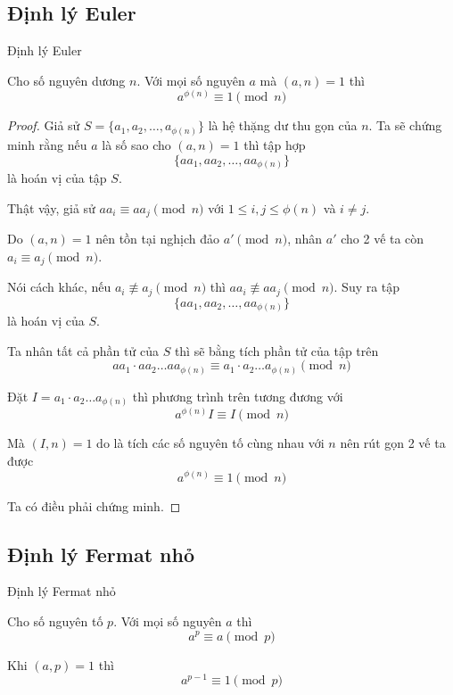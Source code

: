 \subsection{Định lý Euler}

\begin{theoremblock}{Định lý Euler}
    
    Cho số nguyên dương $n$. Với mọi số nguyên $a$ mà $(a, n) = 1$ thì \[a^{\phi(n)} \equiv 1 \pmod n \]
\end{theoremblock}

\begin{proof}
    Giả sử $S = \{a_1, a_2, \ldots, a_{\phi(n)}\}$ là hệ thặng dư thu gọn của $n$. Ta sẽ chứng minh rằng nếu $a$ là số sao cho $(a, n)=1$ thì tập hợp
    \[ \{a a_1, a a_2, \ldots, a a_{\phi(n)}\}\] là hoán vị của tập $S$.

    Thật vậy, giả sử $a a_i \equiv a a_j \pmod n$ với $1 \leq i, j \leq \phi(n)$ và $i \neq j$.

    Do $(a, n) = 1$ nên tồn tại nghịch đảo $a' \pmod n$, nhân $a'$ cho 2 vế ta còn $a_i \equiv a_j \pmod n$.

    Nói cách khác, nếu $a_i \not\equiv a_j \pmod n$ thì $a a_i \not\equiv a a_j \pmod n$. Suy ra tập
    \[ \{a a_1, a a_2, \ldots, a a_{\phi(n)}\} \] là hoán vị của $S$.

    Ta nhân tất cả phần tử của $S$ thì sẽ bằng tích phần tử của tập trên
    \[ a a_1 \cdot a a_2 \ldots a a_{\phi(n)} \equiv a_1 \cdot a_2 \ldots a_{\phi(n)} \pmod n \]

    Đặt $I = a_1 \cdot a_2 \ldots a_{\phi(n)}$ thì phương trình trên tương đương với 
    \[ a^{\phi(n)} I \equiv I \pmod n \]
    
    Mà $(I, n) = 1$ do là tích các số nguyên tố cùng nhau với $n$ nên rút gọn 2 vế ta được
    \[ a^{\phi(n)} \equiv 1 \pmod n \]

    Ta có điều phải chứng minh.
\end{proof}

\subsection{Định lý Fermat nhỏ}

\begin{theoremblock}{Định lý Fermat nhỏ}
    
    Cho số nguyên tố $p$. Với mọi số nguyên $a$ thì \[ a^p \equiv a \pmod p \]

    Khi $(a, p) = 1$ thì \[ a^{p-1} \equiv 1 \pmod p \]
\end{theoremblock}

